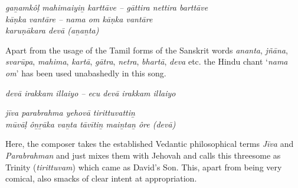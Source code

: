 \begin{myquote}
\textit{gaṉamkôḷ mahimaiyiṉ karttāve – gāttira nettira barttāve \\ kāṇka vantāre – nama om kāṇka vantāre\\ karuṇākara devā (aṉaṉta) }
\end{myquote}

\begin{myquote}
\end{myquote}

\begin{myquote}
\end{myquote}

Apart from the usage of the Tamil forms of the Sanskrit words \textit{ananta}, \textit{jñāna}, \textit{svarūpa}, \textit{mahima}, \textit{kartā}, \textit{gātra}, \textit{netra}, \textit{bhartā}, \textit{deva} etc. the Hindu chant ‘\textit{nama om}’ has been used unabashedly in this song.

\begin{myquote}
\textit{devā irakkam illaiyo – ecu devā irakkam illaiyo}
\end{myquote}

\begin{myquote}
\textit{jīva parabrahma yehovā tirittuvattiṉ \\ mūvāḷ ôṉṟāka vaṉta tāvītiṉ maiṉtaṉ ôre (devā)}
\end{myquote}

\begin{myquote}
\end{myquote}

\begin{myquote}
\end{myquote}

Here, the composer takes the established Vedantic philosophical terms \textit{Jīva} and \textit{Parabrahman} and just mixes them with Jehovah and calls this threesome as Trinity (\textit{tirittuvam}) which came as David’s Son. This, apart from being very comical, also smacks of clear intent at appropriation.

